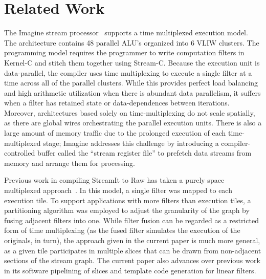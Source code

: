 \section{Related Work}
\label{sec:related}

The Imagine stream processor~\cite{rixner98bandwidthefficient}
supports a time multiplexed execution model.  The architecture
contains 48 parallel ALU's organized into 6 VLIW clusters.  The
programming model requires the programmer to write computation filters
in Kernel-C and stitch them together using Stream-C.  Because the
execution unit is data-parallel, the compiler uses time multiplexing
to execute a single filter at a time across all of the parallel
clusters.  While this provides perfect load balancing and high
arithmetic utilization when there is abundant data parallelism, it
suffers when a filter has retained state or data-dependences between
iterations.  Moreover, architectures based solely on
time-multiplexing do not scale spatially, as there are global wires
orchestrating the parallel execution units.  There is also a large
amount of memory traffic due to the prolonged execution of each
time-multiplexed stage; Imagine addresses this challenge by
introducing a compiler-controlled buffer called the ``stream register
file'' to prefetch data streams from memory and arrange them for
processing.

Previous work in compiling StreamIt to Raw has taken a purely space
multiplexed approach~\cite{streamit-asplos}.  In this model, a single
filter was mapped to each execution tile.  To support applications
with more filters than execution tiles, a partitioning algorithm was
employed to adjust the granularity of the graph by fusing adjacent
filters into one.  While filter fusion can be regarded as a restricted
form of time multiplexing (as the fused filter simulates the execution
of the originals, in turn), the approach given in the current paper is
much more general, as a given tile participates in multiple slices
that can be drawn from non-adjacent sections of the stream graph.  The
current paper also advances over previous work in its software
pipelining of slices and template code generation for linear filters.


